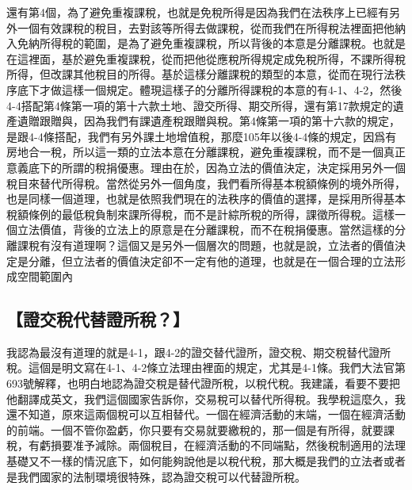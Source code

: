 \documentclass[]{ctexbook}
\begin{document}
還有第4個，為了避免重複課稅，也就是免稅所得是因為我們在法秩序上已經有另外一個有效課稅的稅目，去對該等所得去做課稅，從而我們在所得稅法裡面把他納入免納所得稅的範圍，是為了避免重複課稅，所以背後的本意是分離課稅。也就是在這裡面，基於避免重複課稅，從而把他從應稅所得規定成免稅所得，不課所得稅所得，但改課其他稅目的所得。基於這樣分離課稅的類型的本意，從而在現行法秩序底下才做這樣一個規定。體現這樣子的分離所得課稅的本意的有4-1、4-2，然後4-4搭配第4條第一項的第十六款土地、證交所得、期交所得，還有第17款規定的遺產遺贈跟贈與，因為我們有課遺產稅跟贈與稅。第4條第一項的第十六款的規定，是跟4-4條搭配，我們有另外課土地增值稅，那麼105年以後4-4條的規定，因爲有房地合一稅，所以這一類的立法本意在分離課稅，避免重複課稅，而不是一個真正意義底下的所謂的稅捐優惠。理由在於，因為立法的價值決定，決定採用另外一個稅目來替代所得稅。當然從另外一個角度，我們看所得基本稅額條例的境外所得，也是同樣一個道理，也就是依照我們現在的法秩序的價值的選擇，是採用所得基本稅額條例的最低稅負制來課所得稅，而不是計綜所稅的所得，課徵所得稅。這樣一個立法價值，背後的立法上的原意是在分離課稅，而不在稅捐優惠。當然這樣的分離課稅有沒有道理啊？這個又是另外一個層次的問題，也就是說，立法者的價值決定是分離，但立法者的價值決定卻不一定有他的道理，也就是在一個合理的立法形成空間範圍內

\hypertarget{ux8b49ux4ea4ux7a05ux4ee3ux66ffux8b49ux6240ux7a05}{%
\subsection{【證交稅代替證所稅？】}\label{ux8b49ux4ea4ux7a05ux4ee3ux66ffux8b49ux6240ux7a05}}

我認為最沒有道理的就是4-1，跟4-2的證交替代證所，證交稅、期交稅替代證所稅。這個是明文寫在4-1、4-2條立法理由裡面的規定，尤其是4-1條。我們大法官第693號解釋，也明白地認為證交稅是替代證所稅，以稅代稅。我建議，看要不要把他翻譯成英文，我們這個國家告訴你，交易稅可以替代所得稅。我學稅這麼久，我還不知道，原來這兩個稅可以互相替代。一個在經濟活動的末端，一個在經濟活動的前端。一個不管你盈虧，你只要有交易就要繳稅的，那一個是有所得，就要課稅，有虧損要准予減除。兩個稅目，在經濟活動的不同端點，然後稅制適用的法理基礎又不一樣的情況底下，如何能夠說他是以稅代稅，那大概是我們的立法者或者是我們國家的法制環境很特殊，認為證交稅可以代替證所稅。
\end{document}
